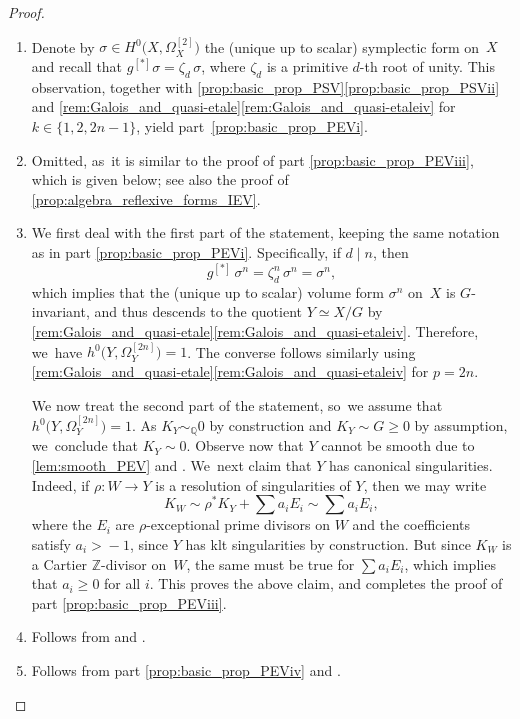 \documentclass[JEP,XML,SOM,Unicode,published]{cedram}
\theoremstyle{plain}
\theoremstyle{definition}
\newcommand{\Z}{\mathbb{Z}}
\newcommand{\Q}{\mathbb{Q}}
\begin{document}
\skpt
\begin{proof}
\begin{enumerate}
\item
Denote by $\sigma \in H^0 \bigl(X, \Omega^{[2]}_X \bigr)$ the (unique up to scalar) symplectic form on~$X$ and recall that $g^{[*]} \sigma = \zeta_d \,\sigma$, where $\zeta_d$ is a primitive $d$-th root of unity.
This observation, together with \autoref{prop:basic_prop_PSV}\eqref{prop:basic_prop_PSVii} and \autoref{rem:Galois_and_quasi-etale}\eqref{rem:Galois_and_quasi-etaleiv} for $k \in \{1, 2, 2n-1 \}$, yield part~\eqref{prop:basic_prop_PEVi}.

\item
Omitted, as~it is similar to the proof of part \eqref{prop:basic_prop_PEViii}, which is given below; see also the proof of \autoref{prop:algebra_reflexive_forms_IEV}.

\item
We first deal with the first part of the statement, keeping the same notation as in part \eqref{prop:basic_prop_PEVi}. Specifically, if $d \mid n$, then
\[
g^{[*]} \,\sigma^n = \zeta_d^n \,\sigma^n = \sigma^n,
\]
which implies that the (unique up to scalar) volume form $\sigma^n$ on~$X$ is $G$\nobreakdash-invariant, and thus descends to the quotient $Y \simeq X / G$ by \autoref{rem:Galois_and_quasi-etale}\eqref{rem:Galois_and_quasi-etaleiv}. Therefore, we~have $h^0 \bigl(Y, \Omega^{[2n]}_Y \bigr) = 1$. The converse follows similarly using \autoref{rem:Galois_and_quasi-etale}\eqref{rem:Galois_and_quasi-etaleiv} for $p=2n$.

We now treat the second part of the statement, so~we assume that $h^0 \bigl(Y, \Omega^{[2n]}_Y \bigr) = 1$. As $K_Y \sim_\Q 0$ by construction and $K_Y \sim G \geq 0$ by assumption, we~conclude that $K_Y \sim 0$. Observe now that $Y$ cannot be smooth due to \autoref{lem:smooth_PEV} and \cite[Prop.\,2.8]{OS11a}. We~next claim that $Y$ has canonical singularities. Indeed, if $\rho \colon W \to Y$ is a resolution of singularities of $Y$, then we may write
\[
K_W \sim \rho^* K_Y + \sum a_i E_i \sim \sum a_i E_i,
\]
where the $E_i$ are $\rho$-exceptional prime divisors on $W$ and the coefficients satisfy \hbox{$a_i \!>\! -1$}, since $Y$ has klt singularities by construction. But since $K_W$ is a Cartier $\Z$-divisor on~$W$, the same must be true for $\sum a_i E_i$, which implies that $a_i \geq 0$ for all $i$. This proves the above claim, and completes the proof of part \eqref{prop:basic_prop_PEViii}.

\item
Follows from \cite[Lem.\,4.6]{BL22} and \cite[Lem.\,5.3]{Graf18}.

\item
Follows from part \eqref{prop:basic_prop_PEViv} and \cite[Lem.\,3.4]{MO67}.\qedhere
\end{enumerate}
\end{proof}
\end{document}
